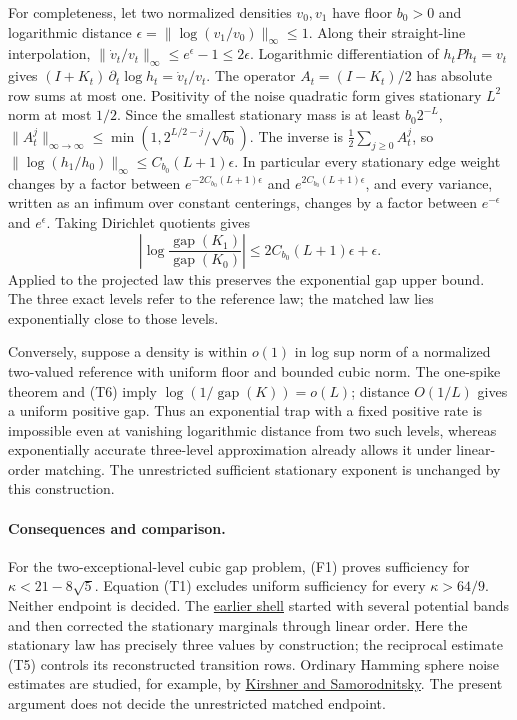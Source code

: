 For completeness, let two normalized densities $v_0,v_1$ have floor
$b_0>0$ and logarithmic distance
$\epsilon=\|\log(v_1/v_0)\|_\infty\le1$. Along their straight-line
interpolation, $\|\dot v_t/v_t\|_\infty\le e^\epsilon-1\le2\epsilon$.
Logarithmic differentiation of $h_tPh_t=v_t$ gives
$(I+K_t)\,\partial_t\log h_t=\dot v_t/v_t$. The operator
$A_t=(I-K_t)/2$ has absolute row sums at most one. Positivity of the
noise quadratic form gives stationary $L^2$ norm at most $1/2$.
Since the smallest stationary mass is at least $b_0 2^{-L}$,
$\|A_t^j\|_{\infty\to\infty}\le\min(1,2^{L/2-j}/\sqrt{b_0})$.
The inverse is $\tfrac12\sum_{j\ge0}A_t^j$, so
$\|\log(h_1/h_0)\|_\infty\le C_{b_0}(L+1)\epsilon$.
In particular every stationary edge weight changes by a factor
between $e^{-2C_{b_0}(L+1)\epsilon}$ and $e^{2C_{b_0}(L+1)\epsilon}$, and every variance, written
as an infimum over constant centerings, changes by a factor between
$e^{-\epsilon}$ and $e^\epsilon$. Taking Dirichlet quotients gives
\[
 \left|\log\frac{\operatorname{gap}(K_1)}
                         {\operatorname{gap}(K_0)}\right|
 \le 2C_{b_0}(L+1)\epsilon+\epsilon. \tag{T6}
\]
Applied to the projected law this preserves the exponential gap
upper bound. The three exact levels refer to the reference law;
the matched law lies exponentially close to those levels.

Conversely, suppose a density is within $o(1)$ in log sup norm of a
normalized two-valued reference with uniform floor and bounded cubic
norm. The one-spike theorem and (T6) imply
$\log(1/\operatorname{gap}(K))=o(L)$; distance $O(1/L)$ gives a
uniform positive gap. Thus an exponential trap with a fixed positive
rate is impossible even at vanishing logarithmic distance from two
such levels, whereas exponentially accurate three-level approximation
already allows it under linear-order matching. The unrestricted
sufficient stationary exponent is unchanged by this construction.

\paragraph{Consequences and comparison.}
For the two-exceptional-level cubic gap problem, (F1) proves
sufficiency for $\kappa<21-8\sqrt5$. Equation (T1) excludes
uniform sufficiency for every $\kappa>64/9$. Neither endpoint is
decided. The \href{https://airr.science/papers/ARR-2026-2B2W1WQ7DF9N5VW7/versions/v1/}{earlier shell}
started with several potential bands and then corrected the stationary
marginals through linear order. Here the stationary law has precisely
three values by construction; the reciprocal estimate (T5) controls
its reconstructed transition rows. Ordinary Hamming sphere noise
estimates are studied, for example, by
\href{https://arxiv.org/abs/1909.11929}{Kirshner and Samorodnitsky}.
The present argument does not decide the unrestricted matched endpoint.
